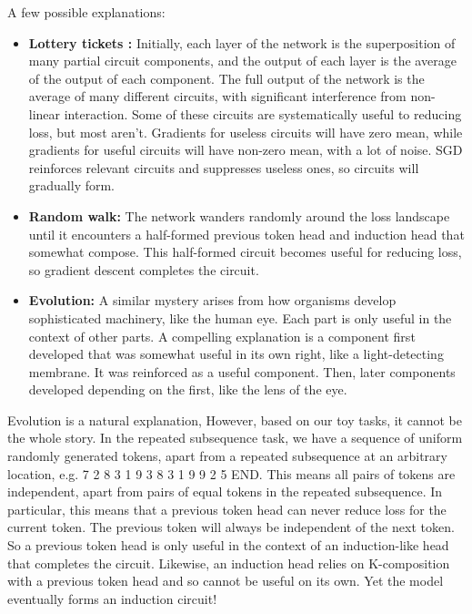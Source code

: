 \documentclass{article} %
\begin{document}
A few possible explanations:
\begin{itemize}
    \item \textbf{Lottery tickets \citep{frankle2018lottery}:} Initially, each layer of the network is the superposition of many partial circuit components, and the output of each layer is the average of the output of each component. The full output of the network is the average of many different circuits, with significant interference from non-linear interaction. Some of these circuits are systematically useful to reducing loss, but most aren't. Gradients for useless circuits will have zero mean, while gradients for useful circuits will have non-zero mean, with a lot of noise. SGD reinforces relevant circuits and suppresses useless ones, so circuits will gradually form.%
    
\item \textbf{Random walk:} The network wanders randomly around the loss landscape until it encounters a half-formed previous token head and induction head that somewhat compose. This half-formed circuit becomes useful for reducing loss, so gradient descent completes the circuit.

\item \textbf{Evolution:} A similar mystery arises from how organisms develop sophisticated machinery, like the human eye. Each part is only useful in the context of other parts. A compelling explanation is a component first developed that was somewhat useful in its own right, like a light-detecting membrane. It was reinforced as a useful component. Then, later components developed depending on the first, like the lens of the eye.
\end{itemize}


Evolution is a natural explanation, However, based on our toy tasks, it cannot be the whole story. In the repeated subsequence task, we have a sequence of uniform randomly generated tokens, apart from a repeated subsequence at an arbitrary location, e.g. 7 2 8 3 1 9 3 8 3 1 9 9 2 5 END. This means all pairs of tokens are independent, apart from pairs of equal tokens in the repeated subsequence. In particular, this means that a previous token head can never reduce loss for the current token. The previous token will always be independent of the next token. So a previous token head is only useful in the context of an induction-like head that completes the circuit. Likewise, an induction head relies on K-composition with a previous token head and so cannot be useful on its own. Yet the model eventually forms an induction circuit!
\end{document}
